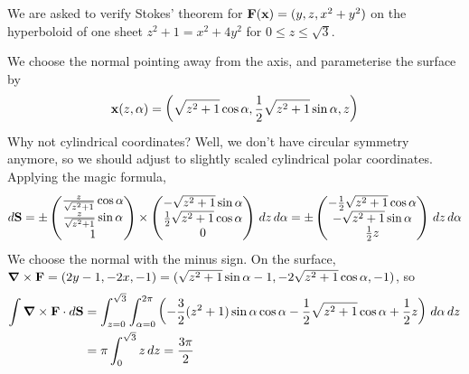\documentclass{../../template/note}
\begin{document}
    \begin{example*}[hard]
        We are asked to verify Stokes' theorem for \(\V F(\V x) = (y, z, x^2+y^2)\) on the hyperboloid of one sheet \(z^2 + 1 = x^2 + 4y^2\) for \(0 \leq z \leq \sqrt 3\).

        We choose the normal pointing away from the axis, and parameterise the surface by
        \begin{align*}
            \V x(z, \alpha) = \left(\sqrt{z^2+1} \cos \alpha, \frac 1 2\sqrt{z^2+1}\sin \alpha, z\right)
        \end{align*}
        Why not cylindrical coordinates? Well, we don't have circular symmetry anymore, so we should adjust to slightly scaled cylindrical polar coordinates. Applying the magic formula,
        \begin{align*}
            d \V S = \pm \begin{pmatrix}
             \frac z{\sqrt{z^2+1}} \cos \alpha \\
             \frac z{\sqrt{z^2+1}} \sin \alpha \\
             1 \\
            \end{pmatrix} \times \begin{pmatrix}
             -\sqrt{z^2+1} \sin \alpha \\
             \frac 1 2 \sqrt{z^2+1} \cos \alpha \\
             0 \\
            \end{pmatrix} \D z \D \alpha = \pm \begin{pmatrix}
             -\frac 1 2 \sqrt{z^2+1} \cos \alpha \\
             -\sqrt{z^2+1} \sin \alpha \\
             \frac 1 2 z \\
            \end{pmatrix} \D z \D \alpha
        \end{align*}
        We choose the normal with the minus sign. On the surface, \(\curl \V F = (2y-1, -2x, -1) = (\sqrt{z^2+1} \sin \alpha - 1, -2\sqrt{z^2+1}\cos \alpha, -1)\), so 
        \begin{align*}
            \int \curl \V F \cdot d \V S &= \int_{z=0}^{\sqrt 3} \int_{\alpha = 0}^{2\pi} \left(-\frac 3 2 (z^2+1) \sin \alpha \cos \alpha - \frac 1 2 \sqrt{z^2+1} \cos \alpha + \frac 1 2 z\right) \D \alpha \D z \\
            &= \pi \int_0^{\sqrt 3} z \D z = \frac{3\pi}{2}

\end{align*}
\end{example*}
\end{document}
